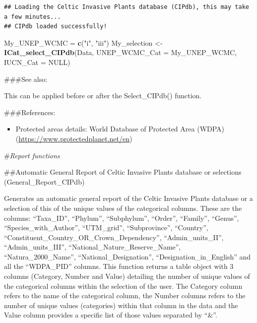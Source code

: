 \documentclass[
]{article}
\newenvironment{Shaded}{\begin{snugshade}}{\end{snugshade}}
\newcommand{\AttributeTok}[1]{\textcolor[rgb]{0.13,0.29,0.53}{#1}}
\newcommand{\ConstantTok}[1]{\textcolor[rgb]{0.56,0.35,0.01}{#1}}
\newcommand{\FunctionTok}[1]{\textcolor[rgb]{0.13,0.29,0.53}{\textbf{#1}}}
\newcommand{\NormalTok}[1]{#1}
\newcommand{\OtherTok}[1]{\textcolor[rgb]{0.56,0.35,0.01}{#1}}
\newcommand{\StringTok}[1]{\textcolor[rgb]{0.31,0.60,0.02}{#1}}
\providecommand{\tightlist}{%
  \setlength{\itemsep}{0pt}\setlength{\parskip}{0pt}}
\begin{document}
\begin{verbatim}
## Loading the Celtic Invasive Plants database (CIPdb), this may take a few minutes...
## CIPdb loaded successfully!
\end{verbatim}

\begin{Shaded}
\begin{Highlighting}[]
\NormalTok{My\_UNEP\_WCMC }\OtherTok{=} \FunctionTok{c}\NormalTok{(}\StringTok{"i"}\NormalTok{, }\StringTok{"iii"}\NormalTok{)}
\NormalTok{My\_selection }\OtherTok{\textless{}{-}} \FunctionTok{ICat\_select\_CIPdb}\NormalTok{(Data, }\AttributeTok{UNEP\_WCMC\_Cat =}\NormalTok{ My\_UNEP\_WCMC, }\AttributeTok{IUCN\_Cat =} \ConstantTok{NULL}\NormalTok{)}
\end{Highlighting}
\end{Shaded}

\#\#\#See also:

This can be applied before or after the Select\_CIPdb() function.

\#\#\#References:

\begin{itemize}
\tightlist
\item
  Protected areas details: World Database of Protected Area (WDPA)
  (\url{https://www.protectedplanet.net/en})
\end{itemize}

\#\emph{Report functions}

\#\#Automatic General Report of Celtic Invasive Plants database or
selections (General\_Report\_CIPdb)

Generates an automatic general report of the Celtic Invasive Plants
database or a selection of this of the unique values of the categorical
columns. These are the columns: ``Taxa\_ID'', ``Phylum'', ``Subphylum'',
``Order'', ``Family'', ``Genus'', ``Species\_with\_Author'',
``UTM\_grid'', ``Subprovince'', ``Country'',
``Constituent\_Country\_OR\_Crown\_Dependency'', ``Admin\_units\_II'',
``Admin\_units\_III'', ``National\_Nature\_Reserve\_Name'',
``Natura\_2000\_Name'', ``National\_Designation'',
``Designation\_in\_English'' and all the ``WDPA\_PID'' columns. This
function returns a table object with 3 columns (Category, Number and
Value) detailing the number of unique values of the categorical columns
within the selection of the user. The Category column refers to the name
of the categorical column, the Number columns refers to the number of
unique values (categories) within that column in the data and the Value
column provides a specific list of those values separated by ``\&''.
\end{document}

